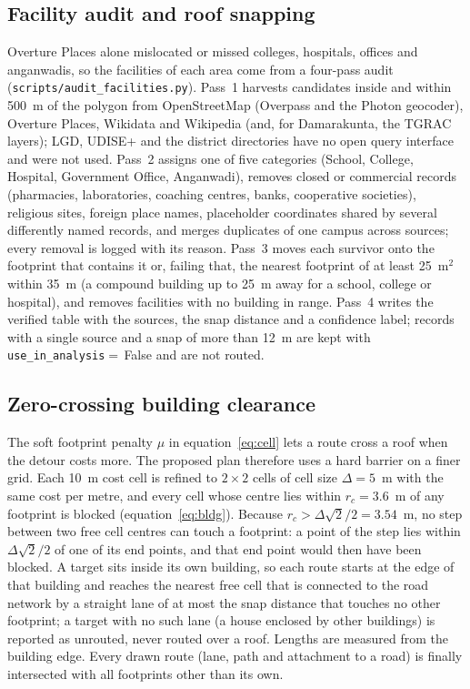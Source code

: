 \documentclass[12pt,a4paper]{article}
\begin{document}
\subsection{Facility audit and roof snapping}
Overture Places alone mislocated or missed colleges, hospitals, offices and anganwadis, so the facilities of each area come from a four-pass audit (\texttt{scripts/audit\_facilities.py}). Pass~1 harvests candidates inside and within 500~m of the polygon from OpenStreetMap (Overpass and the Photon geocoder), Overture Places, Wikidata and Wikipedia (and, for Damarakunta, the TGRAC layers); LGD, UDISE+ and the district directories have no open query interface and were not used. Pass~2 assigns one of five categories (School, College, Hospital, Government Office, Anganwadi), removes closed or commercial records (pharmacies, laboratories, coaching centres, banks, cooperative societies), religious sites, foreign place names, placeholder coordinates shared by several differently named records, and merges duplicates of one campus across sources; every removal is logged with its reason. Pass~3 moves each survivor onto the footprint that contains it or, failing that, the nearest footprint of at least 25~m$^2$ within 35~m (a compound building up to 25~m away for a school, college or hospital), and removes facilities with no building in range. Pass~4 writes the verified table with the sources, the snap distance and a confidence label; records with a single source and a snap of more than 12~m are kept with \texttt{use\_in\_analysis}${}=$\,False and are not routed.

\subsection{Zero-crossing building clearance}
The soft footprint penalty $\mu$ in equation~\ref{eq:cell} lets a route cross a roof when the detour costs more. The proposed plan therefore uses a hard barrier on a finer grid. Each 10~m cost cell is refined to $2\times2$ cells of cell size $\Delta=5$~m with the same cost per metre, and every cell whose centre lies within $r_c=3.6$~m of any footprint is blocked (equation~\ref{eq:bldg}). Because $r_c>\Delta\sqrt2/2=3.54$~m, no step between two free cell centres can touch a footprint: a point of the step lies within $\Delta\sqrt2/2$ of one of its end points, and that end point would then have been blocked. A target sits inside its own building, so each route starts at the edge of that building and reaches the nearest free cell that is connected to the road network by a straight lane of at most the snap distance that touches no other footprint; a target with no such lane (a house enclosed by other buildings) is reported as unrouted, never routed over a roof. Lengths are measured from the building edge. Every drawn route (lane, path and attachment to a road) is finally intersected with all footprints other than its own.
\end{document}
